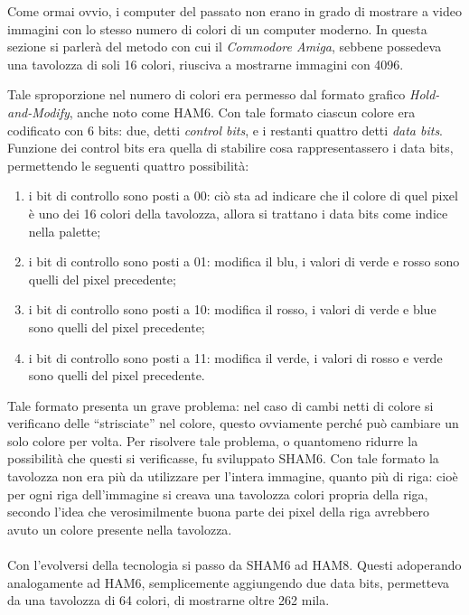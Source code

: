 \documentclass{subfiles}
\begin{document}
Come ormai ovvio, i computer del passato non erano in grado di mostrare a video immagini con lo stesso numero di colori di un computer moderno.
In questa sezione si parlerà del metodo con cui il \emph{Commodore Amiga}, sebbene possedeva una tavolozza di soli 16 colori, riusciva a mostrarne immagini con 4096.

Tale sproporzione nel numero di colori era permesso dal formato grafico \emph{Hold-and-Modify}, anche noto come HAM6.
Con tale formato ciascun colore era codificato con 6 bits: due, detti \emph{control bits}, e i restanti quattro detti \emph{data bits}.
Funzione dei control bits era quella di stabilire cosa rappresentassero i data bits, permettendo le seguenti quattro possibilità:
\begin{enumerate}
    \item i bit di controllo sono posti a 00: ciò sta ad indicare che il colore di quel pixel è uno dei 16 colori della tavolozza,
          allora si trattano i data bits come indice nella palette;
    \item i bit di controllo sono posti a 01: modifica il blu, i valori di verde e rosso sono quelli del pixel precedente;
    \item i bit di controllo sono posti a 10: modifica il rosso, i valori di verde e blue sono quelli del pixel precedente;
    \item i bit di controllo sono posti a 11: modifica il verde, i valori di rosso e verde sono quelli del pixel precedente.
\end{enumerate}

Tale formato presenta un grave problema: nel caso di cambi netti di colore si verificano delle ``strisciate'' nel colore,
questo ovviamente perché può cambiare un solo colore per volta.
Per risolvere tale problema, o quantomeno ridurre la possibilità che questi si verificasse, fu sviluppato SHAM6.
Con tale formato la tavolozza non era più da utilizzare per l'intera immagine, quanto più di riga:
cioè per ogni riga dell'immagine si creava una tavolozza colori propria della riga,
secondo l'idea che verosimilmente buona parte dei pixel della riga avrebbero avuto un colore presente nella tavolozza.
\\ \\
Con l'evolversi della tecnologia si passo da SHAM6 ad HAM8.
Questi adoperando analogamente ad HAM6, semplicemente aggiungendo due data bits, permetteva da una tavolozza di 64 colori, di mostrarne oltre 262 mila.
\end{document}
